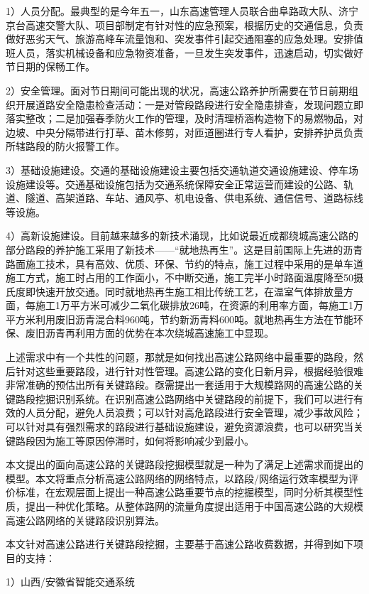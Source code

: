 1）人员分配。最典型的是今年五一，山东高速管理人员联合曲阜路政大队、济宁京台高速交警大队、项目部制定有针对性的应急预案，根据历史的交通信息，负责做好恶劣天气、旅游高峰车流量饱和、突发事件引起交通阻塞的应急处理。安排值班人员，落实机械设备和应急物资准备，一旦发生突发事件，迅速启动，切实做好节日期的保畅工作。

2）安全管理。面对节日期间可能出现的状况，高速公路养护所需要在节日前期组织开展道路安全隐患检查活动：一是对管段路段进行安全隐患排查，发现问题立即落实整改；二是加强春季防火工作的管理，及时清理桥涵构造物下的易燃物品，对边坡、中央分隔带进行打草、苗木修剪，对匝道圈进行专人看护，安排养护员负责所辖路段的防火报警工作。

3）基础设施建设。交通的基础设施建设主要包括交通轨道交通设施建设、停车场设施建设等。交通基础设施包括为交通系统保障安全正常运营而建设的公路、轨道、隧道、高架道路、车站、通风亭、机电设备、供电系统、通信信号、道路标线等设施。

4）高新设施建设。目前越来越多的新技术涌现，比如说最近成都绕城高速公路的部分路段的养护施工采用了新技术——“就地热再生”。这是目前国际上先进的沥青路面施工技术，具有高效、优质、环保、节约的特点，施工过程中采用的是单车道施工方式，施工时占用的工作面小，不中断交通，施工完半小时路面温度降至50摄氏度即快速开放交通。同时就地热再生施工相比传统工艺，在温室气体排放量方面，每施工1万平方米可减少二氧化碳排放26吨，在资源的利用率方面，每施工1万平方米利用废旧沥青混合料960吨，节约新沥青料600吨。就地热再生方法在节能环保、废旧沥青再利用方面的优势在本次绕城高速施工中显现。

上述需求中有一个共性的问题，那就是如何找出高速公路网络中最重要的路段，然后针对这些重要路段，进行针对性管理。高速公路的变化日新月异，根据经验很难非常准确的预估出所有关键路段。亟需提出一套适用于大规模路网的高速公路的关键路段挖掘识别系统。在识别高速公路网络中关键路段的前提下，我们可以进行有效的人员分配，避免人员浪费；可以针对高危路段进行安全管理，减少事故风险；可以针对具有强烈需求的路段进行基础设施建设，避免资源浪费，也可以研究当关键路段因为施工等原因停滞时，如何将影响减少到最小。

本文提出的面向高速公路的关键路段挖掘模型就是一种为了满足上述需求而提出的模型。本文将重点分析高速公路网络的网络特点，以路段/网络运行效率模型为评价标准，在宏观层面上提出一种高速公路重要节点的挖掘模型，同时分析其模型性质，提出一种优化策略。从整体路网的流量角度提出适用于中国高速公路的大规模高速公路网络的关键路段识别算法。

本文针对高速公路进行关键路段挖掘，主要基于高速公路收费数据，并得到如下项目的支持：

1）山西/安徽省智能交通系统

